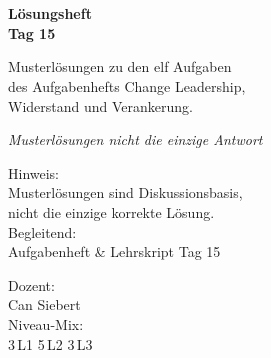 \documentclass[11pt,a4paper,oneside]{article}
\newcommand{\caveatfontfallback}{\itshape}
\newcommand\caveatfont{\caveatfontfallback}%
\begin{document}
\begin{titlepage}
  \pagestyle{empty}
  \vspace*{1.5cm}
  \\[2pt]
  \noindent{\color{lpAccent}\rule{\linewidth}{1.2pt}}\\[4pt]

  \vspace{3cm}
  {\sffamily\fontsize{30}{34}\selectfont\bfseries\color{lpInk}L\"osungsheft\\Tag 15\par}

  \vspace{0.7cm}
  {\sffamily\large\color{lpGray}Musterl\"osungen zu den elf Aufgaben\\des Aufgabenhefts \textendash{} Change Leadership,\\Widerstand und Verankerung.\par}

  \vspace{1.5cm}
  {\caveatfont\LARGE\color{lpGreen}Musterl\"osungen \textperiodcentered{} nicht die einzige Antwort}\par

  \vfill

  \noindent\begin{minipage}{0.55\linewidth}
    {\sffamily\footnotesize\color{lpGray}Hinweis:}\\
    {\sffamily\small\color{lpInk}Musterl\"osungen sind Diskussionsbasis,\\nicht die einzige korrekte L\"osung.}\\[10pt]
    {\sffamily\footnotesize\color{lpGray}Begleitend:}\\
    {\sffamily\small\color{lpInk}Aufgabenheft \& Lehrskript Tag 15}
  \end{minipage}\hfill
  \begin{minipage}{0.4\linewidth}
    \raggedleft
    {\sffamily\footnotesize\color{lpGray}Dozent:}\\
    {\sffamily\small\color{lpInk}Can Siebert}\\[10pt]
    {\sffamily\footnotesize\color{lpGray}Niveau-Mix:}\\
    {\sffamily\small\color{lpInk}3\,L1 \textperiodcentered{} 5\,L2 \textperiodcentered{} 3\,L3}
  \end{minipage}

  \vspace{0.5cm}
  \noindent{\color{lpAccent}\rule{\linewidth}{0.6pt}}
\end{titlepage}
\end{document}
